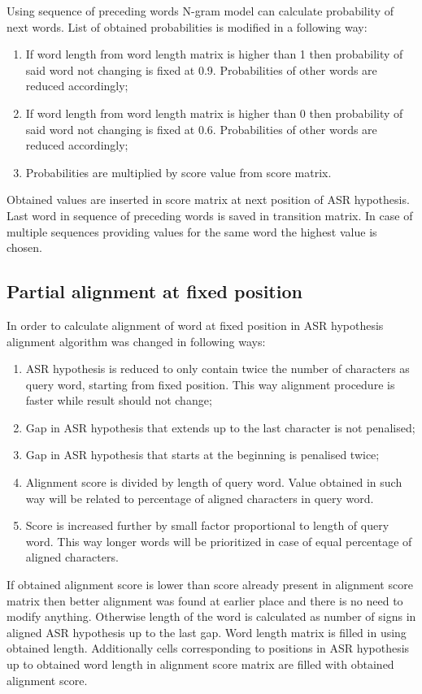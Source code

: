 \documentclass[a4paper,11pt,twoside]{report}
\theoremstyle{definition}
\begin{document}
Using sequence of preceding words N-gram model can calculate probability of next words. List of obtained probabilities is modified in a following way:
\begin{enumerate}
    \item If word length from word length matrix is higher than 1 then probability of said word not changing is fixed at 0.9. Probabilities of other words are reduced accordingly;
    \item If word length from word length matrix is higher than 0 then probability of said word not changing is fixed at 0.6. Probabilities of other words are reduced accordingly;
    \item Probabilities are multiplied by score value from score matrix.
\end{enumerate}
Obtained values are inserted in score matrix at next position of ASR hypothesis. Last word in sequence of preceding words is saved in transition matrix. In case of multiple sequences providing values for the same word the highest value is chosen.

\subsection{Partial alignment at fixed position} \label{sec:alignment}

In order to calculate alignment of word at fixed position in ASR hypothesis alignment algorithm was changed in following ways:
\begin{enumerate}
    \item ASR hypothesis is reduced to only contain twice the number of characters as query word, starting from fixed position. This way alignment procedure is faster while result should not change;
    \item Gap in ASR hypothesis that extends up to the last character is not penalised;
    \item Gap in ASR hypothesis that starts at the beginning is penalised twice;
    \item Alignment score is divided by length of query word. Value obtained in such way will be related to percentage of aligned characters in query word.
    \item Score is increased further by small factor proportional to length of query word. This way longer words will be prioritized in case of equal percentage of aligned characters.
\end{enumerate}

If obtained alignment score is lower than score already present in alignment score matrix then better alignment was found at earlier place and there is no need to modify anything.
Otherwise length of the word is calculated as number of signs in aligned ASR hypothesis up to the last gap. Word length matrix is filled in using obtained length. Additionally cells corresponding to positions in ASR hypothesis up to obtained word length in alignment score matrix are filled with obtained alignment score.
\end{document}
